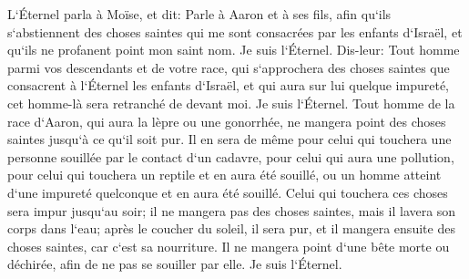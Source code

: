 \verse L`Éternel parla à Moïse, et dit: 
\verse Parle à Aaron et à ses fils, afin qu`ils s`abstiennent des choses saintes qui me sont consacrées par les enfants d`Israël, et qu`ils ne profanent point mon saint nom. Je suis l`Éternel. 
\verse Dis-leur: Tout homme parmi vos descendants et de votre race, qui s`approchera des choses saintes que consacrent à l`Éternel les enfants d`Israël, et qui aura sur lui quelque impureté, cet homme-là sera retranché de devant moi. Je suis l`Éternel. 
\verse Tout homme de la race d`Aaron, qui aura la lèpre ou une gonorrhée, ne mangera point des choses saintes jusqu`à ce qu`il soit pur. Il en sera de même pour celui qui touchera une personne souillée par le contact d`un cadavre, pour celui qui aura une pollution, 
\verse pour celui qui touchera un reptile et en aura été souillé, ou un homme atteint d`une impureté quelconque et en aura été souillé. 
\verse Celui qui touchera ces choses sera impur jusqu`au soir; il ne mangera pas des choses saintes, mais il lavera son corps dans l`eau; 
\verse après le coucher du soleil, il sera pur, et il mangera ensuite des choses saintes, car c`est sa nourriture. 
\verse Il ne mangera point d`une bête morte ou déchirée, afin de ne pas se souiller par elle. Je suis l`Éternel. 
